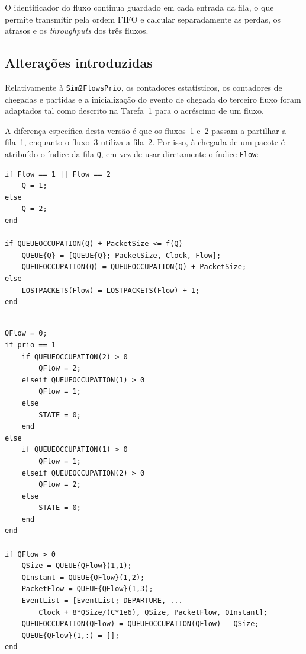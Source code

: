 \documentclass[11pt,a4paper]{article}
\begin{document}
O identificador do fluxo continua guardado em cada entrada da fila, o que
permite transmitir pela ordem FIFO e calcular separadamente as perdas, os
atrasos e os \textit{throughputs} dos três fluxos.

\subsection*{Alterações introduzidas}

Relativamente à \texttt{Sim2FlowsPrio}, os contadores estatísticos, os
contadores de chegadas e partidas e a inicialização do evento de chegada do
terceiro fluxo foram adaptados tal como descrito na Tarefa~1 para o acréscimo
de um fluxo.

A diferença específica desta versão é que os fluxos~1 e~2 passam a partilhar
a fila~1, enquanto o fluxo~3 utiliza a fila~2. Por isso, à chegada de um
pacote é atribuído o índice da fila \texttt{Q}, em vez de usar diretamente o
índice \texttt{Flow}:

\begin{lstlisting}[basicstyle=\ttfamily\scriptsize,
                   caption={Encaminhamento dos três fluxos pelas duas filas.},
                   label={lst:2a-routing}]
if Flow == 1 || Flow == 2
    Q = 1;
else
    Q = 2;
end

if QUEUEOCCUPATION(Q) + PacketSize <= f(Q)
    QUEUE{Q} = [QUEUE{Q}; PacketSize, Clock, Flow];
    QUEUEOCCUPATION(Q) = QUEUEOCCUPATION(Q) + PacketSize;
else
    LOSTPACKETS(Flow) = LOSTPACKETS(Flow) + 1;
end
\end{lstlisting}

\begin{lstlisting}[basicstyle=\ttfamily\scriptsize,
                   caption={Seleção da fila no instante da partida.},
                   label={lst:2a-departure}]

QFlow = 0;
if prio == 1
    if QUEUEOCCUPATION(2) > 0
        QFlow = 2;
    elseif QUEUEOCCUPATION(1) > 0
        QFlow = 1;
    else
        STATE = 0;
    end
else
    if QUEUEOCCUPATION(1) > 0
        QFlow = 1;
    elseif QUEUEOCCUPATION(2) > 0
        QFlow = 2;
    else
        STATE = 0;
    end
end

if QFlow > 0
    QSize = QUEUE{QFlow}(1,1);
    QInstant = QUEUE{QFlow}(1,2);
    PacketFlow = QUEUE{QFlow}(1,3);
    EventList = [EventList; DEPARTURE, ...
        Clock + 8*QSize/(C*1e6), QSize, PacketFlow, QInstant];
    QUEUEOCCUPATION(QFlow) = QUEUEOCCUPATION(QFlow) - QSize;
    QUEUE{QFlow}(1,:) = [];
end
\end{lstlisting}
\end{document}
